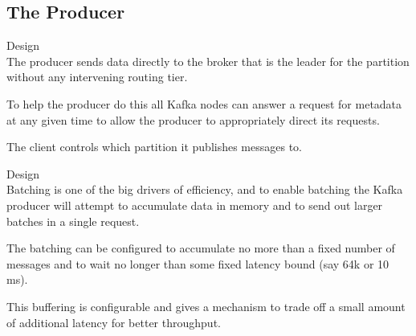 \subsection{The Producer}
\begin{frame}[plain,t]{Design} %
     \\
    \vspace{2ex}
    The producer sends data directly to the broker that is the leader for the partition without any intervening routing tier. 
    
    \vspace{2ex}
    To help the producer do this all Kafka nodes can answer a request for metadata 
    at any given time to allow the producer to appropriately direct its requests.
    
     \vspace{2ex}
    The client controls which partition it publishes messages to.
    
    
\end{frame}
\begin{frame}[plain,t]{Design} %
     \\
    \vspace{2ex}
    Batching is one of the big drivers of efficiency, and to enable batching the Kafka producer will attempt to accumulate data in memory and to send out larger batches in a single request. 
    
    \vspace{2ex}
    The batching can be configured to accumulate no more than a fixed number of messages and to wait no longer than some fixed latency bound (say 64k or 10 ms). 
    
    \vspace{2ex}
    This buffering is configurable and gives a mechanism to trade off a small amount of additional latency for better throughput.
    
    
    
\end{frame}
